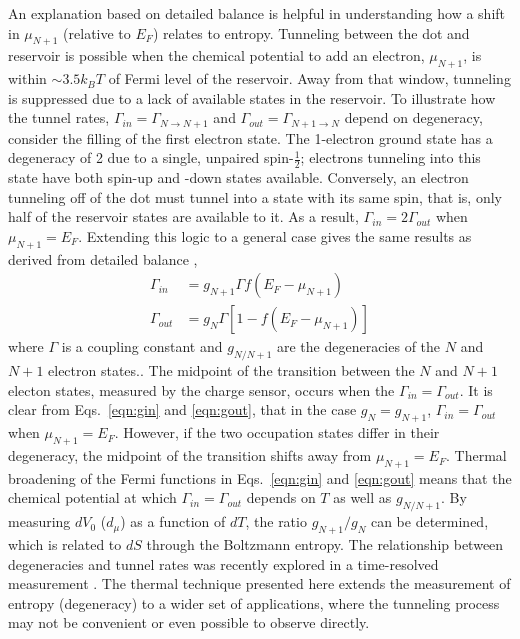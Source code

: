 \documentclass[twocolumn,showpacs,preprintnumbers,amsmath,amssymb,pra,aps,superscriptaddress]{revtex4-1}
\begin{document}
An explanation based on detailed balance is helpful in understanding how a shift in $\mu_{N+1}$ (relative to $E_F$) relates to entropy. Tunneling between the dot and reservoir is possible when the chemical potential to add an electron, $\mu_{N+1}$, is within ${\sim}3.5 k_B T$ of Fermi level of the reservoir. Away from that window, tunneling is suppressed due to a lack of available states in the reservoir. To illustrate how the tunnel rates, $\Gamma_{in}=\Gamma_{N\rightarrow N+1}$ and $\Gamma_{out}=\Gamma_{N+1\rightarrow N}$ depend on degeneracy, consider the filling of the first electron state. The 1-electron ground state has a degeneracy of 2 due to a single, unpaired spin-$\frac{1}{2}$; electrons tunneling into this state have both spin-up and -down states available. Conversely, an electron tunneling off of the dot must tunnel into a state with its same spin, that is, only half of the reservoir states are available to it. As a result, $\Gamma_{in} = 2\Gamma_{out}$ when $\mu_{N+1}=E_F$. Extending this logic to a general case gives the same results as derived from detailed balance \cite{Gustavsson2009}, 
%
\begin{align}
	\Gamma_{in} &=  g_{N+1} \Gamma f(E_F - \mu_{N+1}) \label{eqn:gin}\\
	\Gamma_{out} &= g_{N} \Gamma [1 - f(E_F - \mu_{N+1})] \label{eqn:gout}
\end{align}
%
where $\Gamma$ is a coupling constant and $g_{N/N+1}$ are the degeneracies of the $N$ and $N+1$ electron states.. The midpoint of the transition between the $N$ and $N+1$ electon states, measured by the charge sensor, occurs when the $\Gamma_{in} = \Gamma_{out}$. It is clear from Eqs.~\ref{eqn:gin} and \ref{eqn:gout}, that in the case $g_{N}=g_{N+1}$, $\Gamma_{in} = \Gamma_{out}$ when $\mu_{N+1} = E_F$. However, if the two occupation states differ in their degeneracy, the midpoint of the transition shifts away from $\mu_{N+1}=E_F$. Thermal broadening of the Fermi functions in Eqs.~\ref{eqn:gin} and \ref{eqn:gout} means that the chemical potential at which $\Gamma_{in} = \Gamma_{out}$ depends on $T$ as well as $g_{N/N+1}$. By measuring $dV_0$ ($d_\mu$) as a function of $dT$, the ratio $g_{N+1}/g_{N}$ can be determined, which is related to $dS$ through the Boltzmann entropy. The relationship between degeneracies and tunnel rates was recently explored in a time-resolved measurement \cite{Hofmann2016}.  The thermal technique presented here extends the measurement of entropy (degeneracy) to a wider set of applications, where the tunneling process may not be convenient or even possible to observe directly.
\end{document}
